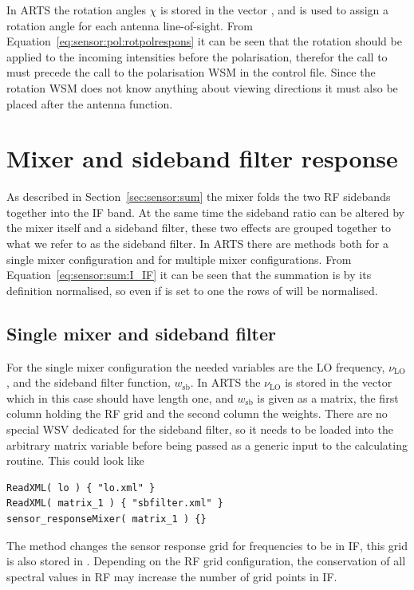 In ARTS the rotation angles $\chi$ is stored in the vector , and is used to assign a rotation angle for each antenna line-of-sight.  From Equation~\ref{eq:sensor:pol:rotpolrespons} it can be seen that the rotation should be applied to the incoming intensities before the polarisation, therefor the call to  must precede the call to the polarisation WSM in the control file. Since the rotation WSM does not know anything about viewing directions it must also be placed after the antenna function. 


\section{Mixer and sideband filter response}
As described in Section~\ref{sec:sensor:sum} the mixer folds the two RF sidebands together into the IF band. At the same time the sideband ratio can be altered by the mixer itself and a sideband filter, these two effects are grouped together to what we refer to as the sideband filter. In ARTS there are methods both for a single mixer configuration and for multiple mixer configurations. From Equation~\ref{eq:sensor:sum:I_IF} it can be seen that the summation is by its definition normalised, so even if  is set to one the rows of  will be normalised.

\subsection{Single mixer and sideband filter}
For the single mixer configuration the needed variables are the LO frequency, $\nu_\mathrm{LO}$, and the sideband filter function, $w_\mathrm{sb}$. In ARTS the $\nu_\mathrm{LO}$ is stored in the vector  which in this case should have length one, and $w_\mathrm{sb}$ is given as a matrix, the first column holding the RF grid and the second column the weights. There are no special WSV dedicated for the sideband filter, so it needs to be loaded into the arbitrary matrix variable  before being passed as a generic input to the calculating routine. This could look like
\begin{verbatim}
ReadXML( lo ) { "lo.xml" }
ReadXML( matrix_1 ) { "sbfilter.xml" }
sensor_responseMixer( matrix_1 ) {}
\end{verbatim}
The method  changes the sensor response grid for frequencies to be in IF, this grid is also stored in . Depending on the RF grid configuration, the conservation of all spectral values in RF may increase the number of grid points in IF.

